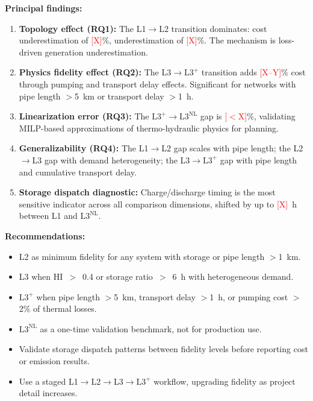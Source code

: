 \documentclass[review,3p]{elsarticle}
\newcommand{\placeholder}[1]{\textcolor{red}{[#1]}}
\newcommand{\Lplus}{\mathrm{L3}^{+}}
\newcommand{\Lnl}{\mathrm{L3}^{\mathrm{NL}}}
\begin{document}
\textbf{Principal findings:}
\begin{enumerate}[nosep]
    \item \textbf{Topology effect (RQ1):} The L1$\to$L2 transition
    dominates: cost underestimation of \placeholder{X}\%, 
    underestimation of \placeholder{X}\%. The mechanism is
    loss-driven generation underestimation.

    \item \textbf{Physics fidelity effect (RQ2):} The L3$\to\Lplus$
    transition adds \placeholder{X--Y}\% cost through pumping and
    transport delay effects. Significant for networks with pipe
    length $>$5~km or transport delay $>$1~h.

    \item \textbf{Linearization error (RQ3):} The $\Lplus\to\Lnl$
    gap is \placeholder{$<$X}\%, validating MILP-based
    approximations of thermo-hydraulic physics for planning.

    \item \textbf{Generalizability (RQ4):} The L1$\to$L2 gap
    scales with pipe length; the L2$\to$L3 gap with demand
    heterogeneity; the L3$\to\Lplus$ gap with pipe length and
    cumulative transport delay.

    \item \textbf{Storage dispatch diagnostic:} Charge/discharge
    timing is the most sensitive indicator across all comparison
    dimensions, shifted by up to \placeholder{X}~h between L1
    and $\Lnl$.
\end{enumerate}

\textbf{Recommendations:}
\begin{itemize}[nosep]
    \item L2 as minimum fidelity for any system with storage or
    pipe length $>$1~km.
    \item L3 when HI~$>$~0.4 or storage ratio~$>$~6~h with
    heterogeneous demand.
    \item $\Lplus$ when pipe length $>$5~km, transport delay
    $>$1~h, or pumping cost $>$2\% of thermal losses.
    \item $\Lnl$ as a one-time validation benchmark, not for
    production use.
    \item Validate storage dispatch patterns between fidelity
    levels before reporting cost or emission results.
    \item Use a staged L1$\to$L2$\to$L3$\to\Lplus$ workflow,
    upgrading fidelity as project detail increases.
\end{itemize}
\end{document}
